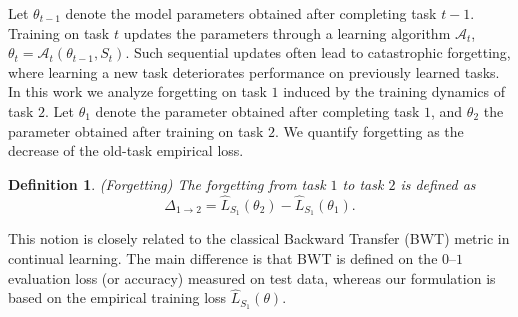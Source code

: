 \documentclass{article}
\newtheorem{definition}{Definition}  %
\begin{document}
Let $\theta_{t-1}$ denote the model parameters obtained after completing task $t-1$.
Training on task $t$ updates the parameters through a learning algorithm $\mathcal{A}_t$, $\theta_t = \mathcal{A}_t(\theta_{t-1}, S_t)$.
Such sequential updates often lead to catastrophic forgetting, where learning a new task deteriorates performance on previously learned tasks.
In this work we analyze forgetting on task $1$ induced by the training dynamics of task $2$.
Let $\theta_1$ denote the parameter obtained after completing task $1$, and $\theta_2$ the parameter obtained after training on task $2$.
We quantify forgetting as the decrease of the old-task empirical loss.
\begin{definition}(Forgetting)
The forgetting from task $1$ to task $2$ is defined as
    \begin{equation}
\Delta_{1\rightarrow2}=
\hat L_{S_1}(\theta_2)
-
\hat L_{S_1}(\theta_1).
\end{equation}
\end{definition}
This notion is closely related to the classical Backward Transfer (BWT) metric in continual learning. The main difference is that BWT is defined on the $0$–$1$ evaluation loss (or accuracy) measured on test data, whereas our formulation is based on the empirical training loss $\hat L_{S_1}(\theta)$. 
\end{document}
